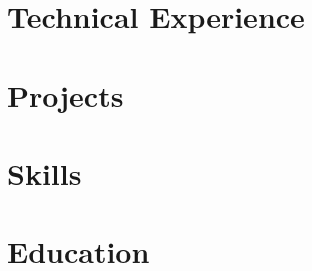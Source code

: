 \documentclass[letter,10pt]{article}
\begin{document}


\section{Technical Experience}


\section{Projects}


\section{Skills}


\section{Education}

\end{document}
